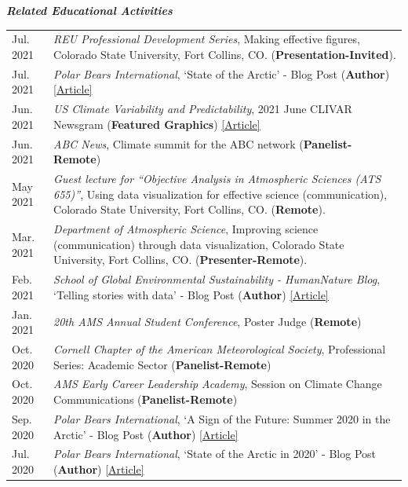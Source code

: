 \documentclass[margin,line,palatino,courier,10pt]{res}
\begin{document}
\begin{resume}
\textit{\textbf{Related Educational Activities}}
\vspace*{0.05in}\\
\begin{tabular}{@{}p{0.9in}p{4in}}
Jul. 2021 & \textit{REU Professional Development Series}, Making effective figures, Colorado State University, Fort Collins, CO. (\textbf{Presentation-Invited}).\\
Jul. 2021 & \textit{Polar Bears International}, `State of the Arctic' - Blog Post (\textbf{Author}) \href{https://polarbearsinternational.org/news/article-climate-change/state-of-the-arctic/}{[Article]}\\
Jun. 2021 & \textit{US Climate Variability and Predictability}, 2021 June CLIVAR Newsgram (\textbf{Featured Graphics}) \href{https://mailchi.mp/usclivar/newsgram-2021june}{[Article]}\\
Jun. 2021 & \textit{ABC News}, Climate summit for the ABC network (\textbf{Panelist-Remote})\\
May 2021 & \textit{Guest lecture for ``Objective Analysis in Atmospheric Sciences (ATS 655)''}, Using data visualization for effective science (communication), Colorado State University, Fort Collins, CO. (\textbf{Remote}).\\
Mar. 2021 & \textit{Department of Atmospheric Science}, Improving science (communication) through data visualization, Colorado State University, Fort Collins, CO. (\textbf{Presenter-Remote}).\\
Feb. 2021 & \textit{School of Global Environmental Sustainability - HumanNature Blog}, `Telling stories with data' - Blog Post (\textbf{Author}) \href{https://sustainability.colostate.edu/blog/humannature/zachary-labe/}{[Article]}\\
Jan. 2021 & \textit{20th AMS Annual Student Conference}, Poster Judge (\textbf{Remote})\\
Oct. 2020 & \textit{Cornell Chapter of the American Meteorological Society}, Professional Series: Academic Sector (\textbf{Panelist-Remote})\\
Oct. 2020 & \textit{AMS Early Career Leadership Academy}, Session on Climate Change Communications (\textbf{Panelist-Remote})\\
Sep. 2020 & \textit{Polar Bears International}, `A Sign of the Future: Summer 2020 in the Arctic' - Blog Post (\textbf{Author}) \href{https://polarbearsinternational.org/news/article-climate-change/a-sign-of-the-future-summer-2020-in-the-arctic/}{[Article]}\\
Jul. 2020 & \textit{Polar Bears International}, `State of the Arctic in 2020' - Blog Post (\textbf{Author}) \href{https://polarbearsinternational.org/news/article-climate-change/state-of-the-arctic-in-2020/}{[Article]}\\

\end{tabular}
\end{resume}
\end{document}
